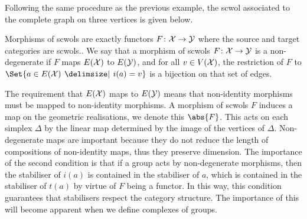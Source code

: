 \begin{example}
	Following the same procedure as the previous example, the scwol associated to the complete graph on three vertices is given below.
	\begin{center}
	\end{center}
	\label{eg:K3_scwol}
\end{example}

\begin{definition}
	Morphisms of scwols are exactly functors $F \colon \mathcal{X} \to \mathcal{Y}$ where the source and target categories are scwols..
	We say that a morphism of scwols $F \colon \mathcal{X} \to \mathcal{Y}$ is a non-degenerate if $F$ maps $E(\mathcal{X})$ to  $E(\mathcal{Y})$, and for all $v \in V(\mathcal{X})$, the restriction of  $F$ to $\Set{a \in E(\calx) \given i(a) = v}$ is a bijection on that set of edges.
\end{definition}


The requirement that $E(\mathcal{X})$ maps to $E(\mathcal{Y})$ means that non-identity morphisms must be mapped to non-identity morphisms.
A morphism of scwols $F$ induces a map on the geometric realisations, we denote this $\abs{F}$.
This acts on each simplex $\Delta$ by the linear map determined by the image of the vertices of $\Delta$.
Non-degenerate maps are important because they do not reduce the length of compositions of non-identity maps, thus they preserve dimension.
The importance of the second condition is that if a group acts by non-degenerate morphisms, then the stabiliser of $i(a)$ is contained in the stabiliser of $a$, which is contained in the stabiliser of $t(a)$ by virtue of $F$  being a functor.
In this way, this condition guarantees that stabilisers respect the category structure.
The importance of this will become apparent when we define complexes of groups.

